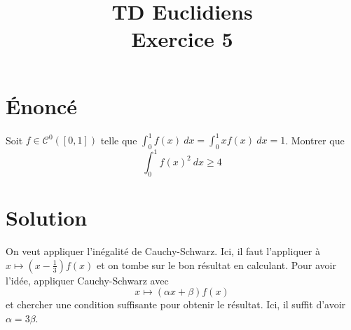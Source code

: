 \documentclass[french]{article}
\title{TD Euclidiens\\ Exercice 5}
\date{}
\begin{document}
\maketitle

\section{Énoncé}
Soit $f\in\mathcal{C}^{0}([0,1])$ telle que $\displaystyle\int_{0}^{1}f(x)\ dx=\int_{0}^{1}xf(x)\ dx=1$. Montrer que $$\int_{0}^{1}f(x)^2\ dx\geqslant 4$$

\section{Solution}
On veut appliquer l'inégalité de Cauchy-Schwarz. Ici, il faut l'appliquer à $x\mapsto \displaystyle\left(x-\frac{1}{3}\right)f(x)$ et on tombe sur le bon résultat en calculant. Pour avoir l'idée, appliquer Cauchy-Schwarz avec $$x\mapsto(\alpha x+\beta)f(x)$$ et chercher une condition suffisante pour obtenir le résultat. Ici, il suffit d'avoir $\alpha =3\beta$.
\end{document}
